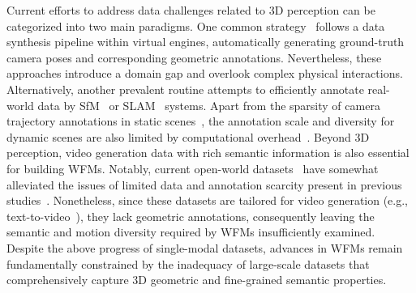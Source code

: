 Current efforts to address data challenges related to 3D perception can be categorized into two main paradigms. 
One common strategy~\cite{cabon2020virtual,yao2020blendedmvs,bai2025recammaster} follows a data synthesis pipeline within virtual engines, automatically generating ground-truth camera poses and corresponding geometric annotations. 
Nevertheless, these approaches introduce a domain gap and overlook complex physical interactions.
Alternatively, another prevalent routine attempts to efficiently annotate real-world data by SfM~\cite{schonberger2016structure} or SLAM~\cite{mur2015orb} systems. Apart from the sparsity of camera trajectory annotations in static scenes~\cite{rockwell2025dynamic}, the annotation scale and diversity for dynamic scenes are also limited by computational overhead~\cite{zhou2018stereo,zhao2024genxd}.
Beyond 3D perception, video generation data with rich semantic information is also essential for building WFMs. Notably, current open-world datasets~\cite{nan2024openvid,wang2025koala,chen2024panda} have somewhat alleviated the issues of limited data and annotation scarcity present in previous studies~\cite{soomro2012ucf101,zhu2022celebv,yuan2024chronomagic}.
Nonetheless, since these datasets are tailored for video generation (e.g., text-to-video~\cite{kong2024hunyuanvideo}), they lack geometric annotations, consequently leaving the semantic and motion diversity required by WFMs insufficiently examined.
Despite the above progress of single-modal datasets, advances in WFMs remain fundamentally constrained by the inadequacy of large-scale datasets that comprehensively capture 3D geometric and fine-grained semantic properties.






